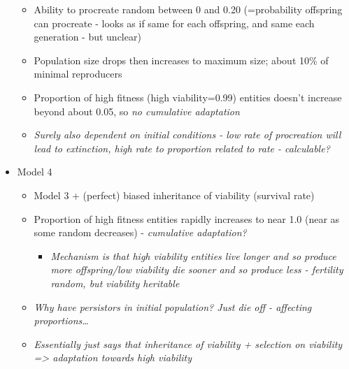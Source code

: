 \begin{itemize}
\begin{itemize}
		\item
		
		Ability to procreate random between 0 and 0.20 (=probability
		offspring can procreate - looks as if same for each offspring,
		and same each generation - but unclear)
		
		\item
		
		Population size drops then increases to maximum size; about 10\%
		of minimal reproducers
		
		\item
		
		Proportion of high fitness (high viability=0.99) entities
		doesn't increase beyond about 0.05, so \emph{no cumulative
			adaptation}
		
		\item
		
		\emph{Surely also dependent on initial conditions - low rate of
			procreation will lead to extinction, high rate to proportion
			related to rate - calculable?}
		
	\end{itemize}
	\item
	
	Model 4
	
	
	\begin{itemize}
		\item
		
		Model 3 + (perfect) biased inheritance of viability (survival
		rate)
		
		\item
		
		Proportion of high fitness entities rapidly increases to near
		1.0 (near as some random decreases) - \emph{cumulative
			adaptation?}
		
		
		\begin{itemize}
			\item
			
			\emph{Mechanism is that high viability entities live longer
				and so produce more offspring/low viability die sooner and so
				produce less - fertility random, but viability heritable}
			
		\end{itemize}
		\item
		
		\emph{Why have persistors in initial population? Just die off -
			affecting proportions\ldots{}}
		
		\item
		
		\emph{Essentially just says that inheritance of viability +
			selection on viability =\textgreater{} adaptation towards high
			viability}
		

\end{itemize}
\end{itemize}
